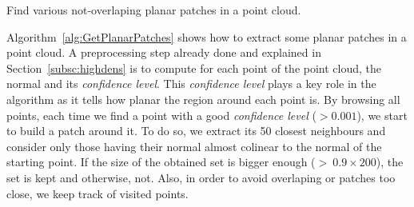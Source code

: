 \begin{algorithm}[tb]
  \SetAlgoVlined
  \DontPrintSemicolon
  \SetArgSty{}
  \caption{Find various not-overlaping planar patches in a point cloud.
    \label{alg:GetPlanarPatches}}
\end{algorithm}

Algorithm~\ref{alg:GetPlanarPatches} shows how to extract some planar patches in a point cloud. A preprocessing step already done and explained in Section~\ref{subsc:highdens} is to compute for each point of the point cloud, the normal and its \emph{confidence level}. This \emph{confidence level} plays a key role in the algorithm as it tells how planar the region around each point is. By browsing all points, each time we find a point with a good \emph{confidence level} ($> 0.001$), we start to build a patch around it. To do so, we extract its 50
closest neighbours and consider only those having their normal almost colinear to the normal of the starting point. If the size of the obtained set is bigger enough ($>\ 0.9 \times 200$), the set is kept and otherwise, not. Also, in order to avoid overlaping or patches too close, we keep track of visited points.

